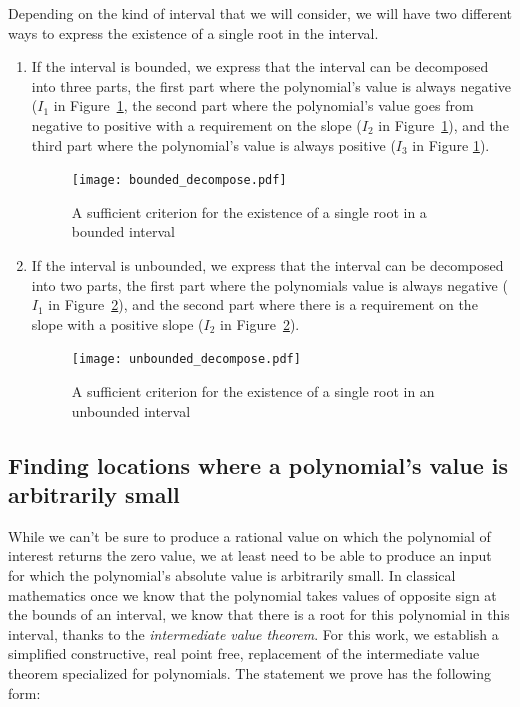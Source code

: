 \documentclass{mscs}
\begin{document}
Depending on the kind of interval that we will consider, we will have
two different ways to express the existence of a single root in the
interval.

\begin{enumerate}
\item If the interval is bounded, we express that the interval can be
  decomposed into three parts, the first part where the polynomial's
  value is always negative (\(I_1\) in Figure~\ref{bounded_decompose}, the second part where the polynomial's
  value goes from negative to positive with a requirement on the
  slope (\(I_2\) in Figure~\ref{bounded_decompose}), and the third part where the polynomial's value is always
  positive (\(I_3\) in Figure \ref{bounded_decompose}).
\begin{figure}[h]\label{bounded_decompose}
\begin{center}
\texttt{[image: bounded\_decompose.pdf]}
\end{center}
\caption{A sufficient criterion for the existence of a single root in a bounded interval}
\end{figure}
\item If the interval is unbounded, we express that the interval can
  be decomposed into two parts, the first part where the polynomials
  value is always negative (\(I_1\) in
  Figure~\ref{unbounded_decompose}), and the second part where there is
  a requirement on the slope with a positive slope (\(I_2\) in
  Figure~\ref{unbounded_decompose}).
\begin{figure}[h]\label{unbounded_decompose}
\begin{center}
\texttt{[image: unbounded\_decompose.pdf]}
\end{center}
\caption{A sufficient criterion for the existence of a single root in an unbounded interval}
\end{figure}
\end{enumerate}
\subsection{Finding locations where a polynomial's value is
  arbitrarily small}
\label{ssec:civt}
While we can't be sure to produce a rational value on which the
polynomial of interest returns the zero value, we at least need to be
able to produce an input for which the polynomial's absolute value is
arbitrarily small. In classical mathematics once we know that the
polynomial takes values of opposite sign at the bounds of an interval,
we know that there is a root for this polynomial in this interval,
thanks to the {\em intermediate value theorem}. For this work, we establish
a simplified constructive, real point free, replacement of the intermediate value
theorem specialized for polynomials.  The statement we prove has the following
form:
\end{document}
